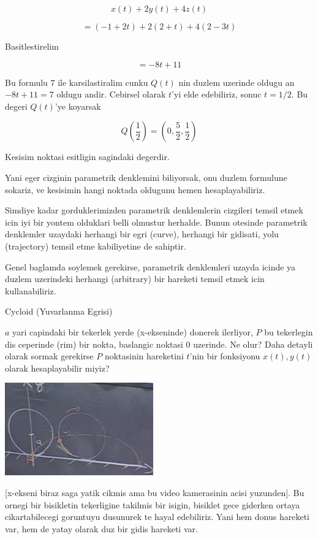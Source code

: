\documentclass[12pt,fleqn]{article}
\begin{document}
\[ x(t) + 2y(t) + 4z(t) \]

\[ = (-1+2t) + 2(2+t) + 4(2-3t) \]

Basitlestirelim

\[ = -8t + 11 \]

Bu formulu $7$ ile karsilastiralim cunku $Q(t)$ nin duzlem uzerinde oldugu
an $-8t + 11 = 7$ oldugu andir. Cebirsel olarak $t$'yi elde edebiliriz,
sonuc $t=1/2$. Bu degeri $Q(t)$'ye koyarsak

\[ Q(\frac{1}{2}) = (0,\frac{5}{2},\frac{1}{2}) \]

Kesisim noktasi esitligin sagindaki degerdir.

Yani eger cizginin parametrik denklemini biliyorsak, onu duzlem formulune
sokariz, ve kesisimin hangi noktada oldugunu hemen hesaplayabiliriz. 

Simdiye kadar gorduklerimizden parametrik denklemlerin cizgileri temsil
etmek icin iyi bir yontem olduklari belli olmustur herhalde. Bunun otesinde
parametrik denklemler uzaydaki herhangi bir egri (curve), herhangi bir
gidisati, yolu (trajectory) temsil etme kabiliyetine de sahiptir. 

Genel baglamda soylemek gerekirse, parametrik denklemleri uzayda icinde ya
duzlem uzerindeki herhangi (arbitrary) bir hareketi temsil etmek icin
kullanabiliriz.

Cycloid (Yuvarlanma Egrisi)

$a$ yari capindaki bir tekerlek yerde (x-ekseninde) donerek ilerliyor, $P$ bu
tekerlegin dis ceperinde (rim) bir nokta, baslangic noktasi 0 uzerinde. Ne
olur? Daha detayli olarak sormak gerekirse $P$ noktasinin hareketini
$t$'nin bir fonksiyonu $x(t),y(t)$ olarak hesaplayabilir miyiz?

\includegraphics[height=4cm]{5_3.png}

[x-ekseni biraz saga yatik cikmis ama bu video kamerasinin acisi
yuzunden]. Bu ornegi bir bisikletin tekerligine takilmis bir isigin,
bisiklet gece giderken ortaya cikartabilecegi goruntuyu dusunurek te hayal
edebiliriz. Yani hem donus hareketi var, hem de yatay olarak duz bir gidis
hareketi var.
\end{document}
